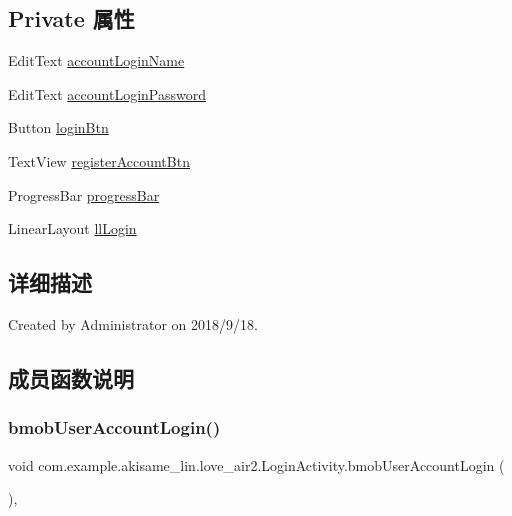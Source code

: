 \subsection*{Private 属性}
\begin{DoxyCompactItemize}
\item 
Edit\+Text \mbox{\hyperlink{classcom_1_1example_1_1akisame__lin_1_1love__air2_1_1_login_activity_a8d03b4a94e1363dba351a685f7a15b2f}{account\+Login\+Name}}
\item 
Edit\+Text \mbox{\hyperlink{classcom_1_1example_1_1akisame__lin_1_1love__air2_1_1_login_activity_a212fa6ff5d1a71339306a8fd36b078dc}{account\+Login\+Password}}
\item 
Button \mbox{\hyperlink{classcom_1_1example_1_1akisame__lin_1_1love__air2_1_1_login_activity_a438b321a231ea22df8ac87f45e1c449b}{login\+Btn}}
\item 
Text\+View \mbox{\hyperlink{classcom_1_1example_1_1akisame__lin_1_1love__air2_1_1_login_activity_a25dd66a90d99f56d96835e1020b8f6d3}{register\+Account\+Btn}}
\item 
Progress\+Bar \mbox{\hyperlink{classcom_1_1example_1_1akisame__lin_1_1love__air2_1_1_login_activity_af026bbbf49ecca5ad8256eadb40a02d6}{progress\+Bar}}
\item 
Linear\+Layout \mbox{\hyperlink{classcom_1_1example_1_1akisame__lin_1_1love__air2_1_1_login_activity_a5ba41fb453a418b3c8ba237167f279d4}{ll\+Login}}
\end{DoxyCompactItemize}


\subsection{详细描述}
Created by Administrator on 2018/9/18. 

\subsection{成员函数说明}
\mbox{\label{classcom_1_1example_1_1akisame__lin_1_1love__air2_1_1_login_activity_a75ccadb3cabebfc821df3c3c81aab1e0}} 
\subsubsection{\texorpdfstring{bmobUserAccountLogin()}{bmobUserAccountLogin()}}
{\footnotesize\ttfamily void com.\+example.\+akisame\+\_\+lin.\+love\+\_\+air2.\+Login\+Activity.\+bmob\+User\+Account\+Login (\begin{DoxyParamCaption}{ }\end{DoxyParamCaption})\hspace{0.3cm}{\ttfamily [inline]}, {\ttfamily [private]}}

